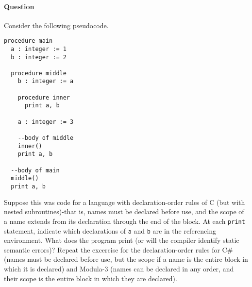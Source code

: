 \documentclass[5pt]{article}
\begin{document}
\subsection{}

\paragraph{Question}
Consider the following pseudocode.

\begin{verbatim}
procedure main
  a : integer := 1
  b : integer := 2
  
  procedure middle
    b : integer := a
    
    procedure inner
      print a, b
      
    a : integer := 3
    
    --body of middle
    inner()
    print a, b
    
  --body of main
  middle()
  print a, b
\end{verbatim}


Suppose this was code for a language with declaration-order rules of C (but
with nested subroutines)-that is, names must be declared before use, and the
scope of a name extends from its declaration through the end of the block. At
each \verb|print| statement, indicate which declarations of \verb|a| and
\verb|b| are in the referencing environment. What does the program print (or
will the compiler identify static semantic errors)? Repeat the excercise for the
declaration-order rules for C\# (names must be declared before use, but the
scope if a name is the entire block in which it is declared) and Modula-3
(names can be declared in any order, and their scope is the entire block in
which they are declared).
\end{document}
